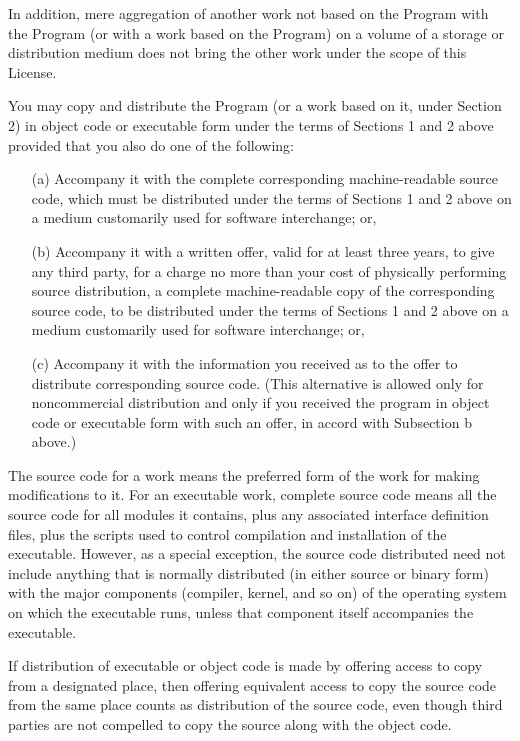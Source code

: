 \documentclass[%
	11pt,
        a4paper,
        twoside]{workrep}
\begin{document}
In addition, mere aggregation of another work not based on the Program
with the Program (or with a work based on the Program) on a volume of
a storage or distribution medium does not bring the other work under
the scope of this License.

\gnuitem %
You may copy and distribute the Program (or a work based on it,
under Section 2) in object code or executable form under the terms of
Sections 1 and 2 above provided that you also do one of the following:
    \begin{itemize} %

    \item[(a)] Accompany it with the complete corresponding machine-readable
    source code, which must be distributed under the terms of Sections
    1 and 2 above on a medium customarily used for software interchange; or,

    \item[(b)] Accompany it with a written offer, valid for at least three
    years, to give any third party, for a charge no more than your
    cost of physically performing source distribution, a complete
    machine-readable copy of the corresponding source code, to be
    distributed under the terms of Sections 1 and 2 above on a medium
    customarily used for software interchange; or,

    \item[(c)] Accompany it with the information you received as to the offer
    to distribute corresponding source code.  (This alternative is
    allowed only for noncommercial distribution and only if you
    received the program in object code or executable form with such
    an offer, in accord with Subsection b above.)
    \end{itemize}

The source code for a work means the preferred form of the work for
making modifications to it.  For an executable work, complete source
code means all the source code for all modules it contains, plus any
associated interface definition files, plus the scripts used to
control compilation and installation of the executable.  However, as a
special exception, the source code distributed need not include
anything that is normally distributed (in either source or binary
form) with the major components (compiler, kernel, and so on) of the
operating system on which the executable runs, unless that component
itself accompanies the executable.

If distribution of executable or object code is made by offering
access to copy from a designated place, then offering equivalent
access to copy the source code from the same place counts as
distribution of the source code, even though third parties are not
compelled to copy the source along with the object code.
\end{document}
